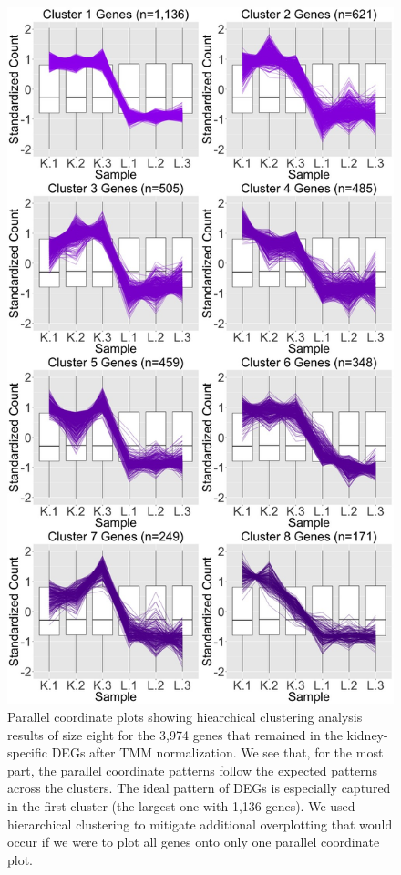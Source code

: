 \documentclass{article}
\begin{document}
\null
\begin{figure}[t!]
\centerline{\includegraphics[width=0.65\columnwidth]{../Bioinformatics/Pictures/liverKidney/Clustering_data_FDR_001_TMMvRaw_Keep/K_L_8.jpg}}
\caption{Parallel coordinate plots showing hiearchical clustering analysis results of size eight for the 3,974 genes that remained in the kidney-specific DEGs after TMM normalization. We see that, for the most part, the parallel coordinate patterns follow the expected patterns across the clusters. The ideal pattern of DEGs is especially captured in the first cluster (the largest one with 1,136 genes). We used hierarchical clustering to mitigate additional overplotting that would occur if we were to plot all genes onto only one parallel coordinate plot.
\label{KeepPCP}}
\end{figure}
\end{document}
